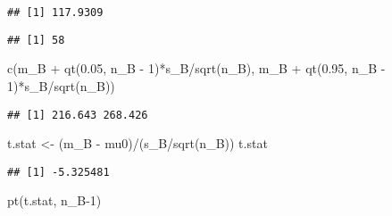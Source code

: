 \documentclass[
]{book}
\newenvironment{Shaded}{\begin{snugshade}}{\end{snugshade}}
\newcommand{\DecValTok}[1]{\textcolor[rgb]{0.00,0.00,0.81}{#1}}
\newcommand{\FloatTok}[1]{\textcolor[rgb]{0.00,0.00,0.81}{#1}}
\newcommand{\FunctionTok}[1]{\textcolor[rgb]{0.00,0.00,0.00}{#1}}
\newcommand{\NormalTok}[1]{#1}
\newcommand{\OtherTok}[1]{\textcolor[rgb]{0.56,0.35,0.01}{#1}}
\newcommand{\SpecialCharTok}[1]{\textcolor[rgb]{0.00,0.00,0.00}{#1}}
\newcommand{\StringTok}[1]{\textcolor[rgb]{0.31,0.60,0.02}{#1}}
\begin{document}
\begin{verbatim}
## [1] 117.9309
\end{verbatim}

\begin{Shaded}
\end{Shaded}

\begin{verbatim}
## [1] 58
\end{verbatim}

\begin{Shaded}
\begin{Highlighting}[]
\FunctionTok{c}\NormalTok{(m\_B }\SpecialCharTok{+} \FunctionTok{qt}\NormalTok{(}\FloatTok{0.05}\NormalTok{, n\_B }\SpecialCharTok{{-}} \DecValTok{1}\NormalTok{)}\SpecialCharTok{*}\NormalTok{s\_B}\SpecialCharTok{/}\FunctionTok{sqrt}\NormalTok{(n\_B), m\_B }\SpecialCharTok{+} \FunctionTok{qt}\NormalTok{(}\FloatTok{0.95}\NormalTok{, n\_B }\SpecialCharTok{{-}} 
\DecValTok{1}\NormalTok{)}\SpecialCharTok{*}\NormalTok{s\_B}\SpecialCharTok{/}\FunctionTok{sqrt}\NormalTok{(n\_B))}
\end{Highlighting}
\end{Shaded}

\begin{verbatim}
## [1] 216.643 268.426
\end{verbatim}

\begin{Shaded}
\begin{Highlighting}[]
\NormalTok{t.stat }\OtherTok{\textless{}{-}}\NormalTok{ (m\_B }\SpecialCharTok{{-}}\NormalTok{ mu0)}\SpecialCharTok{/}\NormalTok{(s\_B}\SpecialCharTok{/}\FunctionTok{sqrt}\NormalTok{(n\_B))}
\NormalTok{t.stat}
\end{Highlighting}
\end{Shaded}

\begin{verbatim}
## [1] -5.325481
\end{verbatim}

\begin{Shaded}
\begin{Highlighting}[]
\FunctionTok{pt}\NormalTok{(t.stat, n\_B}\DecValTok{{-}1}\NormalTok{)}
\end{Highlighting}
\end{Shaded}
\end{document}
